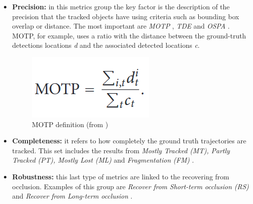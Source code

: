 \begin{itemize}
    \item \textbf{Precision:} in this metrics group the key factor is the description of the precision that the tracked objects have using criteria such as bounding box overlap or distance. The most important are \textit{MOTP} \cite{bernardin2008evaluating}, \textit{TDE} \cite{kratz2010tracking} and \textit{OSPA} \cite{ristic2011metric}. MOTP, for example, uses a ratio with the distance between the ground-truth detections locations \textit{d} and the associated detected locations \textit{c}.
    \begin{figure}[H]
    \begin{center}
    \includegraphics[scale=0.4]{figures/motp.png}
    \caption{MOTP definition (from \cite{bernardin2008evaluating})}
    \label{fig:motp}
    \end{center}
    \end{figure}
    \item \textbf{Completeness:} it refers to how completely the ground truth trajectories are tracked. This set includes the results from \textit{Mostly Tracked (MT), Partly Tracked (PT), Mostly Lost (ML)} and \textit{Fragmentation (FM)} \cite{li2009learning}.
    \item \textbf{Robustness:} this last type of metrics are linked to the recovering from occlusion. Examples of this group are \textit{Recover from Short-term occlusion (RS)} and \textit{Recover from Long-term occlusion} \cite{song2010stochastic}.
\end{itemize}
